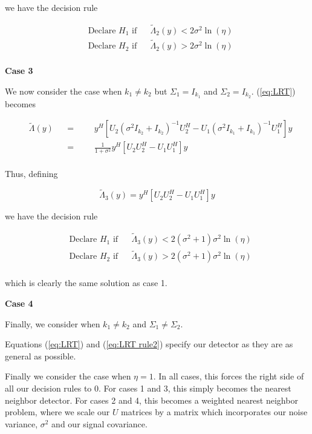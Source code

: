 \documentclass[english]{article}
\begin{document}
we have the decision rule

\begin{equation}
\begin{aligned}
&\text{Declare } H_1 \text{ if}
&& \tilde{\Lambda}_2(y) < 2\sigma^2\ln(\eta)\\
& \text{Declare } H_2 \text{ if}
&& \tilde{\Lambda}_2(y) > 2\sigma^2\ln(\eta)\\
\end{aligned}
\end{equation}

{\bf{Case 3}}

We now consider the case when $k_1\neq k_2$ but $\Sigma_1=I_{k_1}$ and $\Sigma_2=I_{k_2}$. (\ref{eq:LRT}) becomes

\begin{equation}
\begin{aligned}
&\tilde{\Lambda}(y)
&&=
&&&y^H\left[U_2(\sigma^2I_{k_2}+I_{k_2})^{-1}U_2^H-U_1(\sigma^2I_{k_1}+I_{k_1})^{-1}U_1^H\right]y\\
&&&=
&&&\frac{1}{1+\sigma^2}y^H\left[U_2U_2^H-U_1U_1^H\right]y\\
\end{aligned}
\end{equation}

Thus, defining

\begin{equation}
\tilde{\Lambda}_3(y)=y^H\left[U_2U_2^H-U_1U_1^H\right]y
\end{equation}

we have the decision rule

\begin{equation}
\begin{aligned}
&\text{Declare } H_1 \text{ if}
&& \tilde{\Lambda}_3(y) < 2(\sigma^2+1)\sigma^2\ln(\eta)\\
& \text{Declare } H_2 \text{ if}
&& \tilde{\Lambda}_3(y) > 2(\sigma^2+1)\sigma^2\ln(\eta)\\
\end{aligned}
\end{equation}

which is clearly the same solution as case 1.

{\bf{Case 4}}

Finally, we consider when $k_1\neq k_2$ and $\Sigma_1\neq \Sigma_2$.

Equations (\ref{eq:LRT}) and (\ref{eq:LRT rule2}) specify our detector as they are as general as possible.

Finally we consider the case when $\eta=1$. In all cases, this forces the right side of all our decision rules to 0. For cases 1 and 3, this simply becomes the nearest neighbor detector. For cases 2 and 4, this becomes a weighted nearest neighbor problem, where we scale our $U$ matrices by a matrix which incorporates our noise variance, $\sigma^2$ and our signal covariance.
\end{document}
